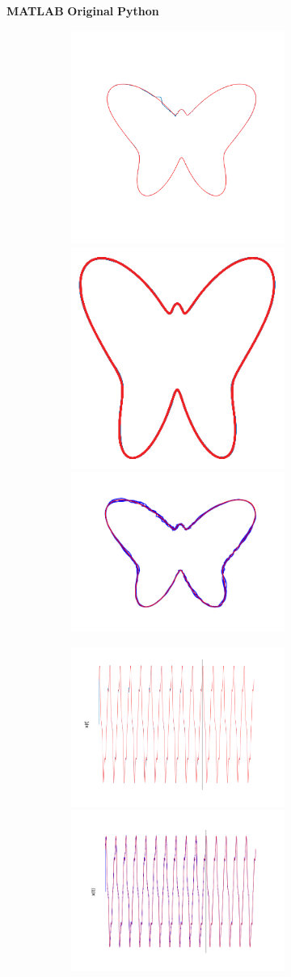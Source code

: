 \begin{figure}

    \centering
    \textbf{MATLAB}\hspace{8em}
    \textbf{Original}\hspace{8em}
    \textbf{Python}
    
    \begin{subfigure}{\textwidth}
        \centering
        
        \textbf{}\begin{subfigure}{\textwidth}
        \centering
    
        \includegraphics[trim=1.5cm 3cm 1.5cm 3cm, clip=true, height=.2\linewidth]{Figures/MATLAB/FORCE_T1_TimeSeries.png} 
        \hspace{3em}
        \includegraphics[height=.19\linewidth]{Figures/Orig/FORCE_T1_TimeSeries.png} 
        \hspace{3em}
        \includegraphics[trim=1.5cm 1.2cm 1.5cm 1.2cm, clip=true,  height=.2\linewidth]{Figures/Python/FORCE_T1_TimeSeries.png}
        
        \end{subfigure}
         
         
        \textbf{}\begin{subfigure}{\textwidth}
        \centering
        
        \includegraphics[trim=2cm 0cm 0cm 0cm, clip=true,height=0.1\linewidth,width=.45\linewidth]{Figures/MATLAB/FORCE_T1_CoordinateX.png}
        \includegraphics[trim=2cm 0cm 0cm 0cm, clip=true,height=0.1\linewidth,width=.45\linewidth]{Figures/Python/FORCE_T1_CoordinateX.png}
        

\end{subfigure}
\end{subfigure}
\end{figure}
